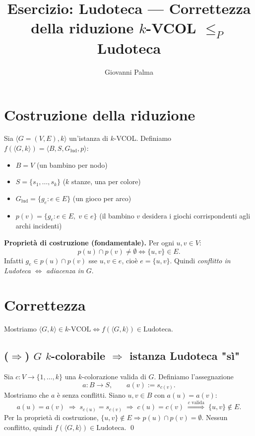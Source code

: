 \documentclass{report}
\title{Esercizio: Ludoteca — Correttezza della riduzione $k$-VCOL $\leq_P$ Ludoteca}
\author{Giovanni Palma}
\date{}
\begin{document}
\maketitle

\section*{Costruzione della riduzione}

Sia $\langle G = (V, E), k\rangle$ un'istanza di $k$-VCOL. Definiamo $f(\langle G, k\rangle) = \langle B, S, G_{\text{lud}}, p\rangle$:
\begin{itemize}
  \item $B = V$ (un bambino per nodo)
  \item $S = \{s_1, \ldots, s_k\}$ ($k$ stanze, una per colore)
  \item $G_{\text{lud}} = \{g_e : e \in E\}$ (un gioco per arco)
  \item $p(v) = \{g_e : e \in E,\; v \in e\}$ (il bambino $v$ desidera i giochi corrispondenti agli archi incidenti)
\end{itemize}

\textbf{Proprietà di costruzione (fondamentale).} Per ogni $u, v \in V$:
\[
  p(u) \cap p(v) \neq \emptyset \iff \{u, v\} \in E.
\]
Infatti $g_e \in p(u) \cap p(v)$ sse $u, v \in e$, cioè $e = \{u, v\}$. Quindi \emph{conflitto in Ludoteca} $\iff$ \emph{adiacenza in $G$}.

\section*{Correttezza}

Mostriamo $\langle G, k\rangle \in k\text{-VCOL} \iff f(\langle G, k\rangle) \in \text{Ludoteca}$.

\subsection*{($\Rightarrow$) $G$ $k$-colorabile $\Rightarrow$ istanza Ludoteca "sì"}

Sia $c : V \to \{1, \ldots, k\}$ una $k$-colorazione valida di $G$. Definiamo l'assegnazione
\[
  a : B \to S, \qquad a(v) := s_{c(v)}.
\]
Mostriamo che $a$ è senza conflitti. Siano $u, v \in B$ con $a(u) = a(v)$:
\[
  a(u) = a(v) \;\Rightarrow\; s_{c(u)} = s_{c(v)} \;\Rightarrow\; c(u) = c(v) \;\overset{c \text{ valida}}{\Longrightarrow}\; \{u, v\} \notin E.
\]
Per la proprietà di costruzione, $\{u, v\} \notin E \Rightarrow p(u) \cap p(v) = \emptyset$. Nessun conflitto, quindi $f(\langle G, k\rangle) \in \text{Ludoteca}$. \qed
\end{document}
